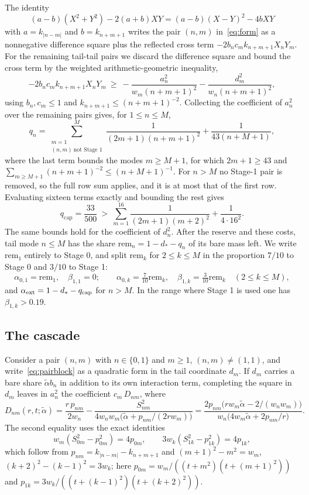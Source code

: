 \documentclass[10pt]{article}
\theoremstyle{remark}
\newcommand{\dstar}{d_{*}}
\begin{document}
The identity
\[
(a-b)(X^2+Y^2)-2(a+b)XY=(a-b)(X-Y)^2-4bXY
\]
with $a=k_{|n-m|}$ and $b=k_{n+m+1}$ writes the pair $(n,m)$ in~\eqref{eq:form} as a nonnegative difference square plus the reflected cross term $-2b_nc_mk_{n+m+1}X_nY_m$. For the remaining tail-tail pairs we discard the difference square and bound the cross term by the weighted arithmetic-geometric inequality,
\[
-2b_nc_mk_{n+m+1}X_nY_m\ \ge\ -\frac{a_n^2}{w_m(n+m+1)^2}-\frac{d_m^2}{w_n(n+m+1)^2},
\]
using $b_n,c_m\le1$ and $k_{n+m+1}\le(n+m+1)^{-2}$. Collecting the coefficient of $a_n^2$ over the remaining pairs gives, for $1\le n\le M$,
\[
q_n=\sum_{\substack{m=1\\(n,m)\ \text{not Stage 1}}}^{M}\frac1{(2m+1)(n+m+1)^2}+\frac1{43(n+M+1)},
\]
where the last term bounds the modes $m\ge M+1$, for which $2m+1\ge43$ and $\sum_{m\ge M+1}(n+m+1)^{-2}\le(n+M+1)^{-1}$. For $n>M$ no Stage-1 pair is removed, so the full row sum applies, and it is at most that of the first row. Evaluating sixteen terms exactly and bounding the rest gives
\[
q_{\mathrm{cap}}=\frac{33}{500}\ >\ \sum_{m=1}^{16}\frac1{(2m+1)(m+2)^2}+\frac1{4\cdot16^2}.
\]
The same bounds hold for the coefficient of $d_n^2$. After the reserve and these costs, tail mode $n\le M$ has the share $\mathrm{rem}_n=1-\dstar-q_n$ of its bare mass left. We write $\mathrm{rem}_1$ entirely to Stage 0, and split $\mathrm{rem}_k$ for $2\le k\le M$ in the proportion $7/10$ to Stage 0 and $3/10$ to Stage 1:
\[
\alpha_{0,1}=\mathrm{rem}_1,\quad\beta_{1,1}=0;\qquad \alpha_{0,k}=\tfrac7{10}\mathrm{rem}_k,\quad\beta_{1,k}=\tfrac3{10}\mathrm{rem}_k\quad(2\le k\le M),
\]
and $\alpha_{\rm ext}=1-\dstar-q_{\rm cap}$ for $n>M$. In the range where Stage 1 is used one has $\beta_{1,k}>0.19$.

\subsection{The cascade}

Consider a pair $(n,m)$ with $n\in\{0,1\}$ and $m\ge1$, $(n,m)\ne(1,1)$, and write~\eqref{eq:pairblock} as a quadratic form in the tail coordinate $d_m$. If $d_m$ carries a bare share $\tilde\alpha b_n$ in addition to its own interaction term, completing the square in $d_m$ leaves in $a_n^2$ the coefficient $c_m\,D_{nm}$, where
\begin{equation}\label{eq:completion}
D_{nm}(r,t;\tilde\alpha)=\frac{r\,p_{nm}}{2w_n}-\frac{S_{nm}^2}{4w_nw_m\bigl(\tilde\alpha+p_{nm}/(2rw_m)\bigr)}
=\frac{2p_{nm}\bigl(rw_m\tilde\alpha-2/(w_nw_m)\bigr)}{w_n\bigl(4w_m\tilde\alpha+2p_{nm}/r\bigr)} .
\end{equation}
The second equality uses the exact identities
\[
w_m(S_{0m}^2-p_{0m}^2)=4p_{0m},\qquad 3w_k(S_{1k}^2-p_{1k}^2)=4p_{1k},
\]
which follow from $p_{nm}=k_{|n-m|}-k_{n+m+1}$ and $(m+1)^2-m^2=w_m$, $(k+2)^2-(k-1)^2=3w_k$; here $p_{0m}=w_m/((t+m^2)(t+(m+1)^2))$ and $p_{1k}=3w_k/((t+(k-1)^2)(t+(k+2)^2))$.
\end{document}
